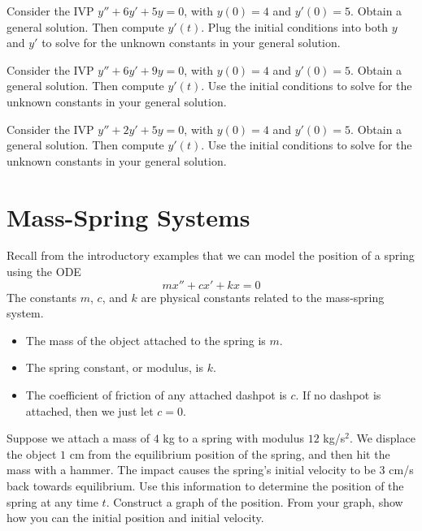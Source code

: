 \begin{problem}
 Consider the IVP $y''+6y'+5y=0$, with $y(0)=4$ and $y'(0)=5$.  Obtain a general solution. Then compute $y'(t)$. Plug the initial conditions into both $y$ and $y'$ to solve for the unknown constants in your general solution. 
\end{problem}

\begin{problem}
 Consider the IVP $y''+6y'+9y=0$, with $y(0)=4$ and $y'(0)=5$.  Obtain a general solution. Then compute $y'(t)$. Use the initial conditions to solve for the unknown constants in your general solution. 
\end{problem}

\begin{problem}
 Consider the IVP $y''+2y'+5y=0$, with $y(0)=4$ and $y'(0)=5$.  Obtain a general solution. Then compute $y'(t)$. Use the initial conditions to solve for the unknown constants in your general solution. 
\end{problem}




\section{Mass-Spring Systems}
 Recall from the introductory examples that we can model the position of a spring using the ODE $$mx''+cx'+kx=0$$
 The constants $m$, $c$, and $k$ are physical constants related to the mass-spring system.
\begin{itemize}
 \item The mass of the object attached to the spring is $m$.
 \item The spring constant, or modulus, is $k$.
 \item The coefficient of friction of any attached dashpot is $c$. If no dashpot is attached, then we just let $c=0$.
\end{itemize}

\begin{problem}
 Suppose we attach a mass of $4$ kg to a spring with modulus $12$ kg/s$^2$. We displace the object $1$ cm from the equilibrium position of the spring, and then hit the mass with a hammer. The impact causes the spring's initial velocity to be 3 cm/s back towards equilibrium.  Use this information to determine the position of the spring at any time $t$. Construct a graph of the position. From your graph, show how you can the initial position and initial velocity.
\end{problem}

